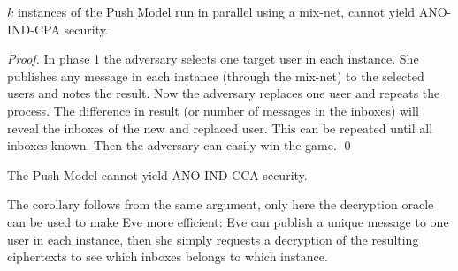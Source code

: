 \begin{theorem}
  \(k\) instances of the Push Model run in parallel using a mix-net, cannot 
  yield ANO-IND-CPA security.
\end{theorem}

\begin{proof}
  In phase 1 the adversary selects one target user in each instance.
  She publishes any message in each instance (through the mix-net) to the 
  selected users and notes the result.
  Now the adversary replaces one user and repeats the process.
  The difference in result (or number of messages in the inboxes) will reveal 
  the inboxes of the new and replaced user.
  This can be repeated until all inboxes known.
  Then the adversary can easily win the game.
  \qed{}
\end{proof}

\begin{corollary}
  The Push Model cannot yield ANO-IND-CCA security.
\end{corollary}

The corollary follows from the same argument, only here the decryption oracle 
can be used to make Eve more efficient:
Eve can publish a unique message to one user in each instance, then she simply 
requests a decryption of the resulting ciphertexts to see which inboxes belongs 
to which instance.

